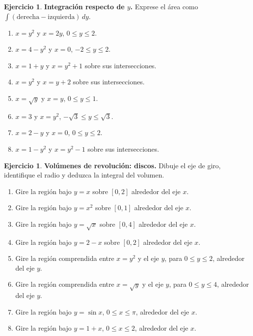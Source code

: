 \documentclass[12pt]{article}
\theoremstyle{definition}
\newtheorem{Ejer}[teorema]{Ejercicio}
\theoremstyle{remark}
\begin{document}
\begin{Ejer}\textbf{Integración respecto de $y$.} Exprese el área como $\int(\text{derecha}-\text{izquierda})\,dy$.
\begin{enumerate}[resume=banco3]
\item $x=y^2$ y $x=2y$, $0\le y\le2$.
\item $x=4-y^2$ y $x=0$, $-2\le y\le2$.
\item $x=1+y$ y $x=y^2+1$ sobre sus intersecciones.
\item $x=y^2$ y $x=y+2$ sobre sus intersecciones.
\item $x=\sqrt y$ y $x=y$, $0\le y\le1$.
\item $x=3$ y $x=y^2$, $-\sqrt3\le y\le\sqrt3$.
\item $x=2-y$ y $x=0$, $0\le y\le2$.
\item $x=1-y^2$ y $x=y^2-1$ sobre sus intersecciones.
\end{enumerate}
\end{Ejer}

\begin{Ejer}\textbf{Volúmenes de revolución: discos.} Dibuje el eje de giro, identifique el radio y deduzca la integral del volumen.
\begin{enumerate}[resume=banco3]
\item Gire la región bajo $y=x$ sobre $[0,2]$ alrededor del eje $x$.
\item Gire la región bajo $y=x^2$ sobre $[0,1]$ alrededor del eje $x$.
\item Gire la región bajo $y=\sqrt x$ sobre $[0,4]$ alrededor del eje $x$.
\item Gire la región bajo $y=2-x$ sobre $[0,2]$ alrededor del eje $x$.
\item Gire la región comprendida entre $x=y^2$ y el eje $y$, para $0\le y\le2$, alrededor del eje $y$.
\item Gire la región comprendida entre $x=\sqrt y$ y el eje $y$, para $0\le y\le4$, alrededor del eje $y$.
\item Gire la región bajo $y=\sin x$, $0\le x\le\pi$, alrededor del eje $x$.
\item Gire la región bajo $y=1+x$, $0\le x\le2$, alrededor del eje $x$.
\end{enumerate}
\end{Ejer}
\end{document}
